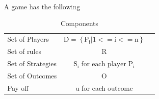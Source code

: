 A game has the following
\begin{table}[h!]
  \begin{center}
    \caption{Components}
    \label{tab:table1}
    \begin{tabular}{l|S|r}
      \hline
    Set of Players & $\mathrm { D } = \left\{\mathrm {P}_{\mathrm{i }}|1<=\mathrm{i}<=\mathrm{n}\right\}$\\
      Set of rules & R \\
      Set of Strategies & $\mathrm { S } _ { \mathrm {i} } \text { for each player } \mathrm { P } _ { \mathrm { i } }$ \\
      Set of Outcomes & O\\
      Pay off & u for each outcome
    \end{tabular}
  \end{center}
\end{table}
